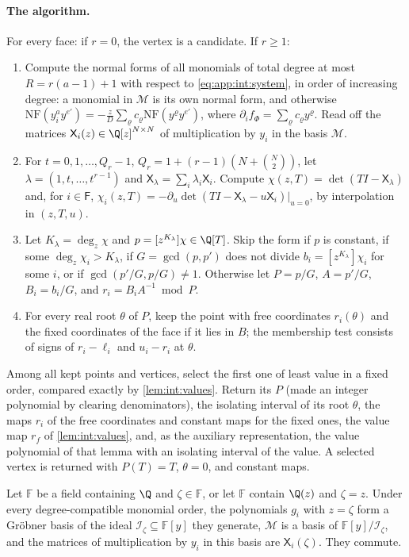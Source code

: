 \paragraph{The algorithm.}
For every face: if $r=0$, the vertex is a candidate. If $r\ge1$:
\begin{enumerate}[label=(\arabic*)]
\item Compute the normal forms of all monomials of total degree at most
$R=r(a-1)+1$ with respect to \eqref{eq:app:int:system}, in order of increasing
degree: a monomial in $\mathcal M$ is its own normal form, and otherwise
$\mathrm{NF}(y_i^ay^{e'})=-\frac zD\sum_\varrho c_\varrho\mathrm{NF}(y^\varrho y^{e'})$,
where $\partial_if_\Phi=\sum_\varrho c_\varrho y^\varrho$. Read off the matrices
$\mathsf X_i(z)\in\Q[z]^{N\times N}$ of multiplication by $y_i$ in the basis
$\mathcal M$.
\item For $t=0,1,\ldots,Q_r-1$, $Q_r=1+(r-1)(N+\binom N2)$, let
$\lambda=(1,t,\ldots,t^{r-1})$ and $\mathsf X_\lambda=\sum_i\lambda_i\mathsf X_i$. Compute
$\chi(z,T)=\det(TI-\mathsf X_\lambda)$ and, for $i\in\mathsf F$,
$\chi_i(z,T)=-\partial_u\det(TI-\mathsf X_\lambda-u\mathsf X_i)\vert_{u=0}$, by interpolation in
$(z,T,u)$.
\item Let $K_\lambda=\deg_z\chi$ and $p=[z^{K_\lambda}]\chi\in\Q[T]$. Skip the
form if $p$ is constant, if some $\deg_z\chi_i>K_\lambda$, if
$G=\gcd(p,p')$ does not divide $b_i=[z^{K_\lambda}]\chi_i$ for some $i$, or if
$\gcd(p'/G,p/G)\ne1$. Otherwise let $P=p/G$, $A=p'/G$, $B_i=b_i/G$, and
$r_i=B_iA^{-1}\bmod P$.
\item For every real root $\theta$ of $P$, keep the point with free coordinates
$r_i(\theta)$ and the fixed coordinates of the face if it lies in $B$; the
membership test consists of signs of $r_i-\ell_i$ and $u_i-r_i$ at $\theta$.
\end{enumerate}
Among all kept points and vertices, select the first one of least value in
a fixed order, compared exactly by \cref{lem:int:values}. Return its $P$
(made an integer polynomial by clearing denominators), the isolating interval
of its root $\theta$, the maps $r_i$ of the free coordinates and constant maps
for the fixed ones, the value map $r_f$ of \cref{lem:int:values}, and, as the
auxiliary representation, the value polynomial of that lemma with an isolating
interval of the value. A selected vertex is returned with $P(T)=T$,
$\theta=0$, and constant maps.

\begin{lemma}\label{lem:int:quotient}
Let $\mathbb F$ be a field containing $\Q$ and $\zeta\in\mathbb F$, or let
$\mathbb F$ contain $\Q(z)$ and $\zeta=z$. Under every degree-compatible monomial
order, the polynomials $g_i$ with $z=\zeta$ form a Gr\"obner basis of the ideal
$\mathcal I_\zeta\subseteq\mathbb F[y]$ they generate, $\mathcal M$ is a basis
of $\mathbb F[y]/\mathcal I_\zeta$, and the matrices of multiplication by $y_i$
in this basis are $\mathsf X_i(\zeta)$. They commute.
\end{lemma}

